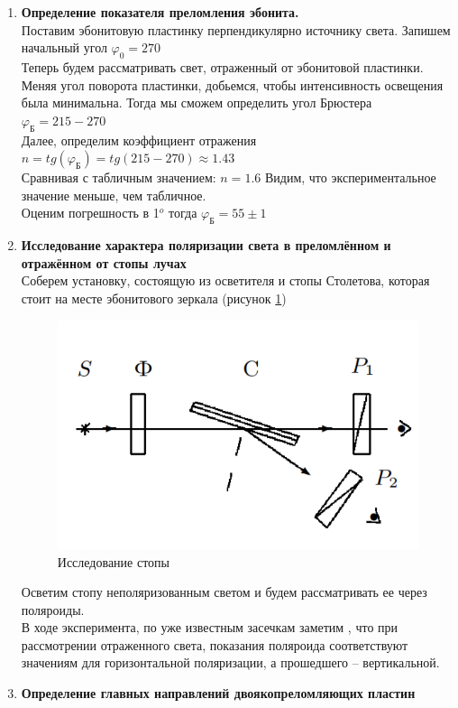 \documentclass[a4paper,12pt]{article}
\begin{document}
\begin{enumerate}
\item \textbf{Определение показателя преломления эбонита.}\\
Поставим эбонитовую пластинку перпендикулярно источнику света. Запишем начальный угол $\varphi_0=270$\\
Теперь будем рассматривать свет, отраженный от эбонитовой пластинки. Меняя угол поворота пластинки, добьемся, чтобы интенсивность освещения была минимальна. Тогда мы сможем определить угол Брюстера $\varphi_{\text{Б}} = 215 - 270$ \\
Далее, определим коэффициент отражения $n =tg(\varphi_{\text{Б}})=tg(215-270)\approx 1.43$\\
Сравнивая с табличным значением: $n = 1.6$ Видим, что экспериментальное значение меньше, чем табличное.\\ 
Оценим погрешность в 1$^o$
тогда  $\varphi_{\text{Б}} = 55\pm 1$
\item \textbf{Исследование характера поляризации света в преломлённом и отражённом
от стопы лучах}\\
Соберем установку, состоящую из осветителя и стопы Столетова, которая стоит на месте эбонитового зеркала (рисунок \ref{stopa})
\begin{figure}[h!]
\centering
\includegraphics[scale=0.5]{stopa.png} 
\caption{Исследование стопы}
\label{stopa}
\end{figure}
Осветим стопу неполяризованным светом и будем рассматривать ее через поляроиды. \\
В ходе эксперимента, по уже известным засечкам заметим , что при рассмотрении отраженного света, показания поляроида соответствуют значениям для горизонтальной поляризации, а прошедшего -- вертикальной.
\item \textbf{Определение главных направлений двоякопреломляющих пластин}\\

\end{enumerate}
\end{document}
